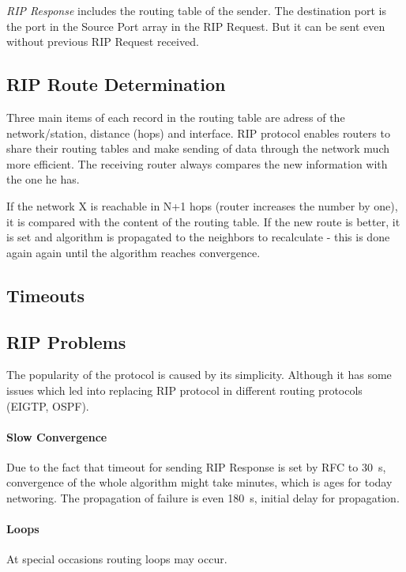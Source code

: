 \documentclass[10pt,a4paper,titlepage]{article}
\begin{document}
            {\it RIP Response} includes the routing table of the sender. The destination port is the port in the Source Port
            array in the RIP Request. But it can be sent even without previous RIP Request received.\cite{RIPngStd}

        \subsection*{RIP Route Determination}
            Three main items of each record in the routing table are adress of the network/station, distance (hops)
            and interface. RIP protocol enables routers to share their routing tables and make sending of data through
            the network much more efficient. The receiving router always compares the new information with the one he has.

            If the network X is reachable in N+1 hops (router increases the number by one), it is compared with the content
            of the routing table. If the new route is better, it is set and algorithm is propagated to the neighbors to
            recalculate - this is done again again until the algorithm reaches convergence.\cite{RIPguide}

        \subsection*{Timeouts}

        \subsection*{RIP Problems}
            The popularity of the protocol is caused by its simplicity. Although it has some issues which led into replacing
            RIP protocol in different routing protocols (EIGTP, OSPF).

        \paragraph{Slow Convergence}
            Due to the fact that timeout for sending RIP Response is set by RFC to 30~s, convergence of the whole algorithm
            might take minutes, which is ages for today networing. The propagation of failure is even 180~s, initial delay
            for propagation.

        \paragraph{Loops}
            At special occasions routing loops may occur.
\end{document}
